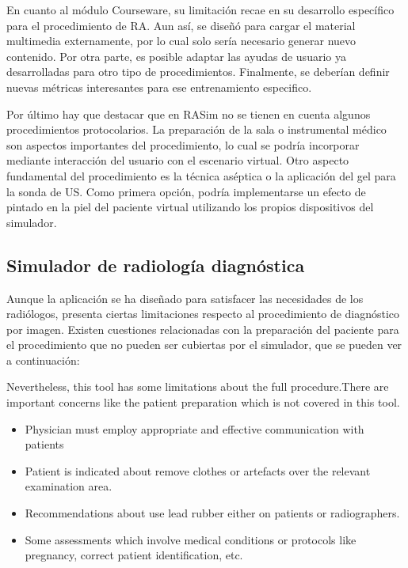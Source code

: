 
En cuanto al módulo \ac{Courseware}, su limitación recae en su desarrollo específico para el procedimiento de \ac{RA}. Aun así, se diseñó para cargar el material multimedia externamente, por lo cual solo sería necesario generar nuevo  contenido. Por otra parte, es posible adaptar las ayudas de usuario  ya desarrolladas para otro tipo de procedimientos. Finalmente, se deberían definir nuevas métricas interesantes para ese entrenamiento especifico.


Por último hay que destacar que en \ac{RASim} no se tienen en cuenta algunos procedimientos protocolarios. La preparación de la sala o instrumental médico son aspectos importantes del procedimiento, lo cual se podría incorporar mediante interacción del usuario con el escenario virtual. Otro aspecto fundamental del procedimiento es la técnica aséptica o la aplicación del gel para la sonda de \ac{US}. Como primera opción, podría implementarse un efecto de pintado en la piel del paciente virtual utilizando los propios dispositivos del simulador. 


\subsection{Simulador de radiología diagnóstica}

Aunque la aplicación se ha diseñado para satisfacer las necesidades de los radiólogos, presenta ciertas limitaciones respecto al procedimiento de diagnóstico por imagen. Existen cuestiones relacionadas con la preparación del paciente para el procedimiento que no pueden ser cubiertas por el simulador, que se pueden ver a continuación:

Nevertheless, this tool has some limitations about the full procedure.There are important concerns like the patient preparation which is not covered in this tool.
\begin{itemize}



 \item Physician must employ appropriate and effective communication with patients

 \item Patient is indicated about remove clothes or artefacts over the relevant examination area.

 \item Recommendations about use lead rubber either on patients or radiographers.

 \item Some assessments which involve medical conditions or protocols like pregnancy, correct patient identification, etc.
 
 \end{itemize}

